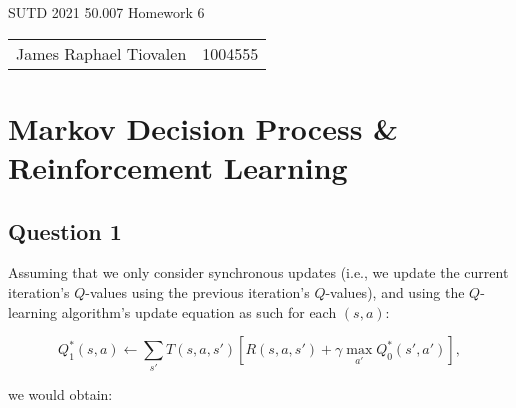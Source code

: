 \documentclass[11pt,fancychapters]{article}
\begin{document}
\centerline{\huge{SUTD 2021 50.007 Homework 6}}

\begin{table}[ht]
\centering
\footnotesize
 \begin{tabular}{c c} 
James Raphael Tiovalen & 1004555
 \end{tabular}
\end{table}

\section*{Markov Decision Process \& Reinforcement Learning}

\subsection*{Question 1}

Assuming that we only consider synchronous updates (i.e., we update the current iteration's $Q$-values using the previous iteration's $Q$-values), and using the $Q$-learning algorithm's update equation as such for each $(s, a)$:

\begin{equation*}
	Q_1^* (s, a) \leftarrow \sum_{s'}{T(s, a, s')[R(s, a, s') + \gamma \max_{a'}Q_0^*(s', a')]},
\end{equation*}

we would obtain:
\end{document}
